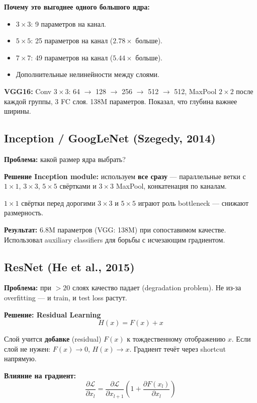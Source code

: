 \documentclass[a4paper,12pt]{article}
\begin{document}
\textbf{Почему это выгоднее одного большого ядра:}
\begin{itemize}
    \item $3\times3$: 9 параметров на канал.
    \item $5\times5$: 25 параметров на канал ($2.78\times$ больше).
    \item $7\times7$: 49 параметров на канал ($5.44\times$ больше).
    \item Дополнительные нелинейности между слоями.
\end{itemize}

\textbf{VGG16:} Conv $3\times3$: 64 $\to$ 128 $\to$ 256 $\to$ 512 $\to$ 512, MaxPool $2\times2$ после каждой группы, 3 FC слоя. 138M параметров. Показал, что глубина важнее ширины.

\subsection{Inception / GoogLeNet (Szegedy, 2014)}

\textbf{Проблема:} какой размер ядра выбрать?

\textbf{Решение Inception module:} используем \textbf{все сразу} — параллельные ветки с $1\times1$, $3\times3$, $5\times5$ свёртками и $3\times3$ MaxPool, конкатенация по каналам.

$1\times1$ свёртки перед дорогими $3\times3$ и $5\times5$ играют роль bottleneck — снижают размерность.

\textbf{Результат:} 6.8M параметров (VGG: 138M) при сопоставимом качестве. Использовал auxiliary classifiers для борьбы с исчезающим градиентом.

\subsection{ResNet (He et al., 2015)}

\textbf{Проблема:} при $> 20$ слоях качество падает (degradation problem). Не из-за overfitting — и train, и test loss растут.

\textbf{Решение: Residual Learning}
\[
H(x) = F(x) + x
\]

Слой учится \textbf{добавке} (residual) $F(x)$ к тождественному отображению $x$. Если слой не нужен: $F(x) \to 0$, $H(x) \to x$. Градиент течёт через shortcut напрямую.

\textbf{Влияние на градиент:}
\[
\frac{\partial \mathcal{L}}{\partial x_l} = \frac{\partial \mathcal{L}}{\partial x_{l+1}} \left(1 + \frac{\partial F(x_l)}{\partial x_l}\right)
\]
\end{document}
